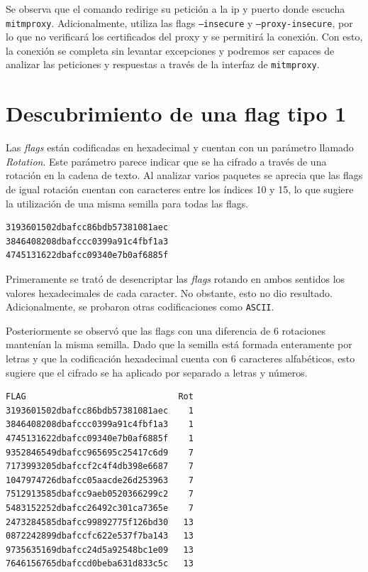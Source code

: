 \documentclass[]{article}
\begin{document}
Se observa que el comando redirige su petición a la ip y puerto donde escucha
\texttt{mitmproxy}. Adicionalmente, utiliza las flags \texttt{--insecure} y
\texttt{--proxy-insecure}, por lo que no verificará los certificados del proxy
y se permitirá la conexión. Con esto, la conexión se completa sin levantar
excepciones y podremos ser capaces de analizar las peticiones y respuestas a
través de la interfaz de \texttt{mitmproxy}.

\section{Descubrimiento de una flag tipo 1}
\label{sec:tipo1}

Las \textit{flags} están codificadas en hexadecimal y cuentan con un parámetro
llamado \textit{Rotation}. Este parámetro parece indicar que se ha cifrado a
través de una rotación en la cadena de texto. Al analizar varios paquetes se
aprecia que las flags de igual rotación cuentan con caracteres entre los
índices 10 y 15, lo que sugiere la utilización de una misma semilla para todas
las flags.

\lstset{style=flag}
\begin{lstlisting}[language=flag, caption=Varias flags para rotation 1 donde la semilla es dbafcc]
3193601502dbafcc86bdb57381081aec
3846408208dbafccc0399a91c4fbf1a3
4745131622dbafcc09340e7b0af6885f
\end{lstlisting}

Primeramente se trató de desencriptar las \textit{flags} rotando en ambos sentidos los valores hexadecimales de cada caracter. No obstante, esto no dio resultado. Adicionalmente, se probaron otras codificaciones como \texttt{ASCII}.

Posteriormente se observó que las flags con una diferencia de 6 rotaciones mantenían la misma semilla. Dado que la semilla está formada enteramente por letras y que la codificación hexadecimal cuenta con 6 caracteres alfabéticos, esto sugiere que el cifrado se ha aplicado por separado a letras y números.

\begin{lstlisting}[language=flag, escapechar=@, caption=Varias flag con la misma semilla y 6 rotaciones]
FLAG                              Rot
3193601502dbafcc86bdb57381081aec    1
3846408208dbafccc0399a91c4fbf1a3    1
4745131622dbafcc09340e7b0af6885f    1
9352846549dbafcc965695c25417c6d9    7
7173993205dbafccf2c4f4db398e6687    7
1047974726dbafcc05aacde26d253963    7
7512913585dbafcc9aeb0520366299c2    7
5483152252dbafcc26492c301ca7365e    7
2473284585dbafcc99892775f126bd30   13
0872242899dbafccfc622e537f7ba143   13
9735635169dbafcc24d5a92548bc1e09   13
7646156765dbafccd0beba631d833c5c   13
\end{lstlisting}
\end{document}
